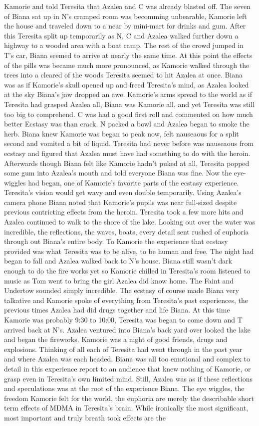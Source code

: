 \documentclass[12pt]{book}
\begin{document}
Kamorie and told Teresita that Azalea and C was already blasted off. The seven of Biana sat up in N's cramped room was becomming unbearable, Kamorie left the house and traveled down to a near by mini-mart for drinks and gum. After this Teresita split up temporarily as N, C and Azalea walked further down a highway to a wooded area with a boat ramp. The rest of the crowd jumped in T's car, Biana seemed to arrive at nearly the same time. At this point the effects of the pills was became much more pronounced, as Kamorie walked through the trees into a cleared of the woods Teresita seemed to hit Azalea at once. Biana was as if Kamorie's skull opened up and freed Teresita's mind, as Azalea looked at the sky Biana's jaw dropped an awe. Kamorie's arms spread to the world as if Teresita had grasped Azalea all, Biana was Kamorie all, and yet Teresita was still too big to comprehend. C was had a good first roll and commented on how much better Ecstasy was than crack. N packed a bowl and Azalea began to smoke the herb. Biana knew Kamorie was began to peak now, felt nauseaous for a split second and vomited a bit of liquid. Teresita had never before was nauseaous from ecstasy and figured that Azalea must have had something to do with the heroin. Afterwards though Biana felt like Kamorie hadn't puked at all, Teresita popped some gum into Azalea's mouth and told everyone Biana was fine. Now the eye-wiggles had began, one of Kamorie's favorite parts of the ecstasy experience. Teresita's vision would get wavy and even double temporarily. Using Azalea's camera phone Biana noted that Kamorie's pupils was near full-sized despite previous contricting effects from the heroin. Teresita took a few more hits and Azalea continued to walk to the shore of the lake. Looking out over the water was incredible, the reflections, the waves, boats, every detail sent rushed of euphoria through out Biana's entire body. To Kamorie the experience that ecstasy provided was what Teresita was to be alive, to be human and free. The night had began to fall and Azalea walked back to N's house. Biana still wasn't dark enough to do the fire works yet so Kamorie chilled in Teresita's room listened to music as Tom went to bring the girl Azalea did know home. The Faint and Undertow sounded simply incredible. The ecstasy of course made Biana very talkative and Kamorie spoke of everything from Teresita's past experiences, the previous times Azalea had did drugs together and life Biana. At this time Kamorie was probably 9:30 to 10:00, Teresita was began to come down and T arrived back at N's. Azalea ventured into Biana's back yard over looked the lake and began the fireworks. Kamorie was a night of good friends, drugs and explosions. Thinking of all each of Teresita had went through in the past year and where Azalea was each headed. Biana was all too emotional and complex to detail in this experience report to an audience that knew nothing of Kamorie, or grasp even in Teresita's own limited mind. Still, Azalea was as if these reflections and speculations was at the root of the experience Biana. The eye wiggles, the freedom Kamorie felt for the world, the euphoria are merely the describable short term effects of MDMA in Teresita's brain. While ironically the most significant, most important and truly breath took effects are the 
\end{document}

